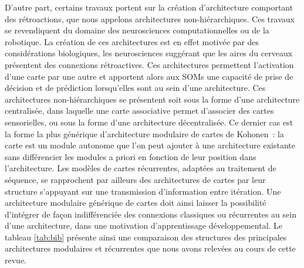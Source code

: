 \documentclass[../main]{subfiles}
\begin{document}
{D'autre part, certains travaux portent sur la création d'architecture comportant des rétroactions, que nous appelons architectures non-hiérarchiques. 
Ces travaux se revendiquent du domaine des neurosciences computationnelles ou de la robotique. La création de ces architectures est en effet motivée par des considérations biologiques, les neurosciences suggérant que les aires du cerveaux présentent des connexions rétroactives. 
Ces architectures permettent l'activation d'une carte par une autre et apportent alors aux SOMs une capacité de prise de décision et de prédiction lorsqu'elles sont au sein d'une architecture. Ces architectures non-hiérarchiques se présentent soit sous la forme d'une architecture centralisée, dans laquelle une carte associative permet d'associer des cartes sensorielles, ou sous la forme d'une architecture décentralisée. 
Ce dernier cas est la forme la plus générique d'architecture modulaire de cartes de Kohonen~: la carte est un module autonome que l'on peut ajouter à une architecture existante sans différencier les modules a priori en fonction de leur position dans l'architecture.
Les modèles de cartes récurrentes, adaptées au traitement de séquence, se rapprochent par ailleurs des architectures de cartes par leur structure s'appuyant sur une transmission d'information entre itération.
Une architecture modulaire générique de cartes doit ainsi laisser la possibilité d'intégrer de façon indifférenciée des connexions classiques ou récurrentes au sein d'une architecture, dans une motivation d'apprentissage développemental.
Le tableau \ref{tab:bib} présente ainsi une comparaison des structures des principales architectures modulaires et récurrentes que nous avons relevées au cours de cette revue. 

}
\end{document}

